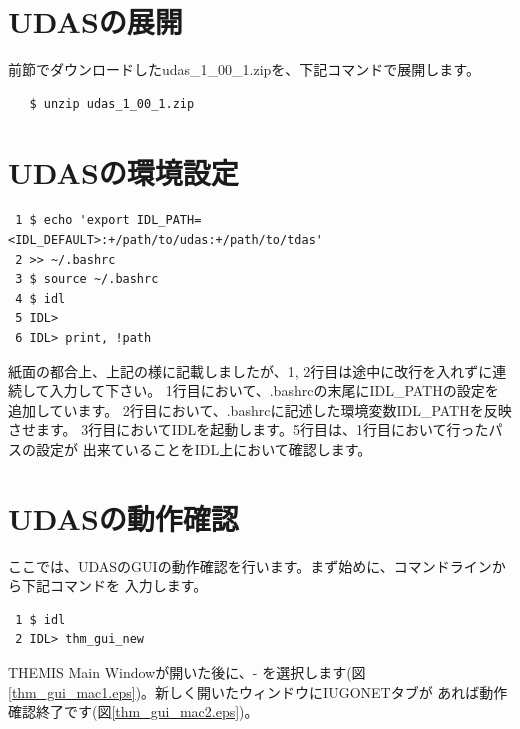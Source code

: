 \documentclass[a4j]{jbook}
\begin{document}
\section{UDASの展開}
前節でダウンロードしたudas\_1\_00\_1.zipを、下記コマンドで展開します。
\begin{screen}
\begin{verbatim}
   $ unzip udas_1_00_1.zip
\end{verbatim}
\end{screen}

\section{UDASの環境設定}

\begin{screen}
\begin{verbatim}
 1 $ echo 'export IDL_PATH=<IDL_DEFAULT>:+/path/to/udas:+/path/to/tdas' 
 2 >> ~/.bashrc
 3 $ source ~/.bashrc
 4 $ idl
 5 IDL>
 6 IDL> print, !path
\end{verbatim}
\end{screen}
紙面の都合上、上記の様に記載しましたが、1, 2行目は途中に改行を入れずに連続して入力して下さい。
1行目において、.bashrcの末尾にIDL\_PATHの設定を追加しています。
2行目において、.bashrcに記述した環境変数IDL\_PATHを反映させます。
3行目においてIDLを起動します。5行目は、1行目において行ったパスの設定が
出来ていることをIDL上において確認します。\par

\section{UDASの動作確認}

ここでは、UDASのGUIの動作確認を行います。まず始めに、コマンドラインから下記コマンドを
入力します。
\begin{screen}
\begin{verbatim}
 1 $ idl
 2 IDL> thm_gui_new
\end{verbatim}
\end{screen}
THEMIS Main Windowが開いた後に、-
を選択します(図\ref{thm_gui_mac1.eps})。新しく開いたウィンドウにIUGONETタブが
あれば動作確認終了です(図\ref{thm_gui_mac2.eps})。
\end{document}

